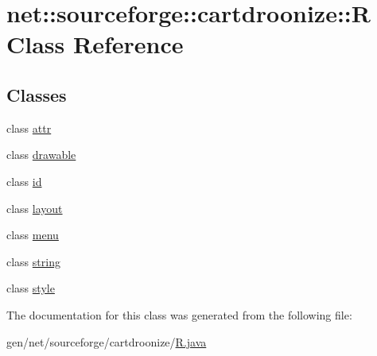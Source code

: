 \hypertarget{classnet_1_1sourceforge_1_1cartdroonize_1_1R}{
\section{net::sourceforge::cartdroonize::R Class Reference}
\label{classnet_1_1sourceforge_1_1cartdroonize_1_1R}
}
\subsection*{Classes}
\begin{DoxyCompactItemize}
\item 
class \hyperlink{classnet_1_1sourceforge_1_1cartdroonize_1_1R_1_1attr}{attr}
\item 
class \hyperlink{classnet_1_1sourceforge_1_1cartdroonize_1_1R_1_1drawable}{drawable}
\item 
class \hyperlink{classnet_1_1sourceforge_1_1cartdroonize_1_1R_1_1id}{id}
\item 
class \hyperlink{classnet_1_1sourceforge_1_1cartdroonize_1_1R_1_1layout}{layout}
\item 
class \hyperlink{classnet_1_1sourceforge_1_1cartdroonize_1_1R_1_1menu}{menu}
\item 
class \hyperlink{classnet_1_1sourceforge_1_1cartdroonize_1_1R_1_1string}{string}
\item 
class \hyperlink{classnet_1_1sourceforge_1_1cartdroonize_1_1R_1_1style}{style}
\end{DoxyCompactItemize}


The documentation for this class was generated from the following file:\begin{DoxyCompactItemize}
\item 
gen/net/sourceforge/cartdroonize/\hyperlink{R_8java}{R.java}\end{DoxyCompactItemize}
